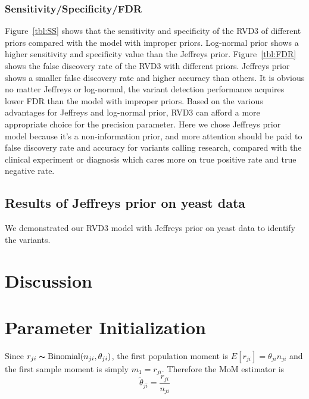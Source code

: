 \documentclass[11pt,reqno]{amsart}
\begin{document}
\subsubsection{Sensitivity/Specificity/FDR}

Figure~\ref{tbl:SS} shows that the sensitivity and specificity of the RVD3 of different priors compared with the model with improper priors. Log-normal prior shows a higher sensitivity and specificity value than the Jeffreys prior.
Figure~\ref{tbl:FDR} shows the false discovery rate of the RVD3 with different priors. Jeffreys prior shows a smaller false discovery rate and higher accuracy than others. It is obvious no matter Jeffreys or log-normal, the variant detection performance acquires lower FDR than the model with improper priors. Based on the various advantages for Jeffreys and log-normal prior, RVD3 can afford a more appropriate choice for the precision parameter. Here we chose Jeffreys prior model because it's a non-information prior, and more attention should be paid to false discovery rate and accuracy for variants calling research, compared with the clinical experiment or diagnosis which cares more on true positive rate and true negative rate.
\subsection{Results of Jeffreys prior on yeast data}

We demonstrated our RVD3 model with Jeffreys prior on yeast data to identify the variants.


\section{Discussion}


\appendix

\section{Parameter Initialization}\label{sec:appendix_mom}
Since $r_{ji} \thicksim \text{Binomial}(n_{ji}, \theta_{ji})$, the first population moment is  $E[r_{ji}] = \theta_{ji} n_{ji}$ and the first sample moment is simply $m_1 = r_{ji}$. Therefore the MoM estimator is
\begin{equation}
	\tilde{\theta}_{ji} = \frac{r_{ji}} {n_{ji}}
\end{equation}
\end{document}
